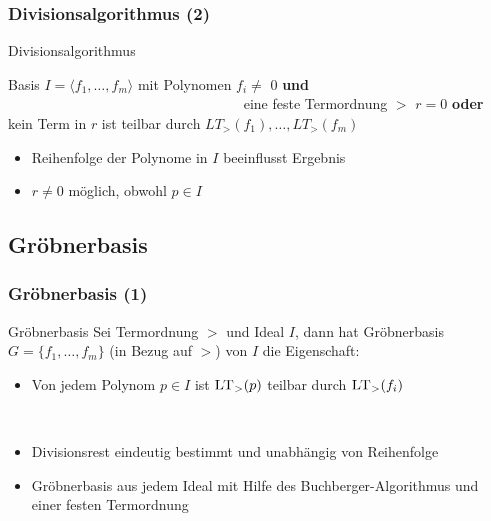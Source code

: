 \documentclass{beamer}
\begin{document}
\begin{frame}[fragile]
\frametitle{Divisionsalgorithmus (2)}




\begin{algorithm}[H]
\caption{Divisionsalgorithmus  }

\begin{algorithmic}[1]

\Require Basis $I = \langle f_{1}, \dots, f_{m}\rangle$ mit  Polynomen $f_{i} \neq$ 0 \textbf{und} ~~~~~~~~~~~~~~~~~~~~~~~~~~~~~~~~~ eine feste Termordnung $>$  
\Ensure $r=0$ \textbf{oder} kein Term in $r$ ist teilbar durch $ LT_{>}\left( f_{1}\right) , \dots , LT_{>} \left( f_{m}\right) $

\end{algorithmic}
\end{algorithm}


\begin{itemize}
\item Reihenfolge der Polynome in $I$ beeinflusst Ergebnis
\item $r \neq 0$ möglich, obwohl $p \in I$ 
\end{itemize}


\end{frame}



\subsection{Gröbnerbasis}


\begin{frame}[<+->][fragile]
\frametitle{Gröbnerbasis (1)}


\begin{block}{Gröbnerbasis  }
Sei Termordnung $>$ und Ideal $I$, dann hat Gröbnerbasis $G = \{f_{1}, \ldots, f_{m} \}$ (in Bezug auf $>$) von $I$ die Eigenschaft: 
\begin{itemize}
\item Von jedem Polynom $p \in I$ ist $\textsc{LT}_{>}(p)$ teilbar durch $\textsc{LT}_{>}(f_{i})$  
\end{itemize} 
\end{block}

~\\
\begin{itemize}
\item Divisionsrest eindeutig bestimmt und unabhängig von Reihenfolge
~\\
\item Gröbnerbasis aus jedem Ideal mit Hilfe des Buchberger-Algorithmus und einer festen Termordnung 
\end{itemize}



\end{frame}
\end{document}
